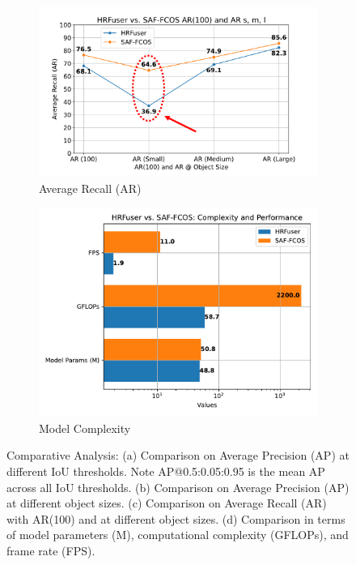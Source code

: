 \documentclass[report.tex]{subfiles}
\begin{document}
\begin{figure}[h!]
\begin{subfigure}[b]{0.45\textwidth}
            \includegraphics[width=\textwidth]{images/results/saf_vs_hrfuser/ar_anno.pdf}
            \caption{Average Recall (AR)}
            \label{fig:saf_vs_hrfuser_ar}
        \end{subfigure}
        \hfill
        \begin{subfigure}[b]{0.45\textwidth}
            \centering
            \includegraphics[width=\textwidth]{images/results/saf_vs_hrfuser/model_complexity.pdf}
            \caption{Model Complexity}
            \label{fig:saf_vs_hrfuser_model_complexity}
        \end{subfigure}
        \caption{Comparative Analysis: (a) Comparison on Average Precision (AP) at different IoU thresholds. Note AP@0.5:0.05:0.95 is the mean AP across all IoU thresholds. (b) Comparison on Average Precision (AP) at different object sizes. (c) Comparison on Average Recall (AR) with AR(100) and at different object sizes. (d) Comparison in terms of model parameters (M), computational complexity (GFLOPs), and frame rate (FPS).}
        \label{fig:comparative_analysis}
    \end{figure}
\end{document}
